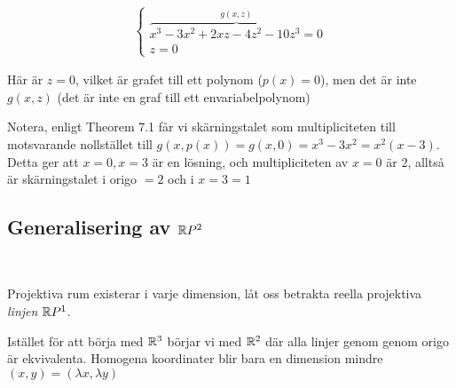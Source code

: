 \begin{equation*}
  \begin{gathered}
    \begin{cases}
      \overbrace{x^3-3x^2+2xz-4z^2-10z^3=0}^{\text{$g(x,z)$}}\\
      z=0
    \end{cases}
  \end{gathered}
\end{equation*}\par
\noindent Här är $z=0$, vilket är grafet till ett polynom ($p(x)=0$), men det är inte $g(x,z)$ (det är inte en graf till ett envariabelpolynom)\par
\noindent Notera, enligt Theorem 7.1 får vi skärningstalet som multipliciteten till motsvarande nollstället till $g(x,p(x)) = g(x,0) = x^3-3x^2 =x^2(x-3)$. Detta ger att $x=0, x=3$ är en lösning, och multipliciteten av $x=0$ är 2, alltså är skärningstalet i origo $=2$ och i $x=3=1$
\par\bigskip
\subsection{Generalisering av $\mathbb{R} P^2$}\hfill\\\par
\noindent Projektiva rum existerar i varje dimension, låt oss betrakta reella projektiva \textit{linjen} $\mathbb{R} P^1$.\par
\noindent Istället för att börja med $\mathbb{R}^3$ börjar vi med $\mathbb{R}^2$ där alla linjer genom genom origo är ekvivalenta. Homogena koordinater blir bara en dimension mindre $(x,y)=(\lambda x, \lambda y)$

